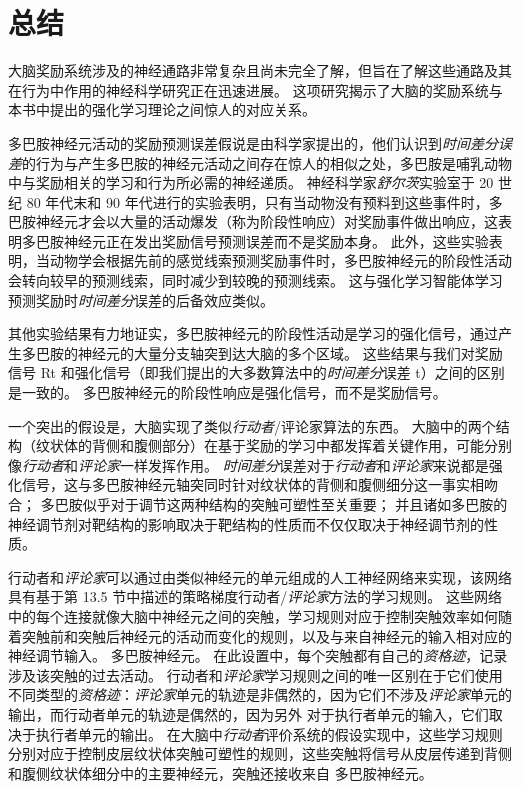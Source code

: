 \section{总结}

大脑奖励系统涉及的神经通路非常复杂且尚未完全了解，但旨在了解这些通路及其在行为中作用的神经科学研究正在迅速进展。
这项研究揭示了大脑的奖励系统与本书中提出的强化学习理论之间惊人的对应关系。


多巴胺神经元活动的奖励预测误差假说是由科学家提出的，他们认识到\textit{时间差分误差}的行为与产生多巴胺的神经元活动之间存在惊人的相似之处，多巴胺是哺乳动物中与奖励相关的学习和行为所必需的神经递质。
神经科学家\textit{舒尔茨}实验室于 20 世纪 80 年代末和 90 年代进行的实验表明，只有当动物没有预料到这些事件时，多巴胺神经元才会以大量的活动爆发（称为阶段性响应）对奖励事件做出响应，这表明多巴胺神经元正在发出奖励信号预测误差而不是奖励本身。
此外，这些实验表明，当动物学会根据先前的感觉线索预测奖励事件时，多巴胺神经元的阶段性活动会转向较早的预测线索，同时减少到较晚的预测线索。
这与强化学习智能体学习预测奖励时\textit{时间差分}误差的后备效应类似。


其他实验结果有力地证实，多巴胺神经元的阶段性活动是学习的强化信号，通过产生多巴胺的神经元的大量分支轴突到达大脑的多个区域。
这些结果与我们对奖励信号 Rt 和强化信号（即我们提出的大多数算法中的\textit{时间差分}误差 t）之间的区别是一致的。
多巴胺神经元的阶段性响应是强化信号，而不是奖励信号。


一个突出的假设是，大脑实现了类似\textit{行动者}/评论家算法的东西。
大脑中的两个结构（纹状体的背侧和腹侧部分）在基于奖励的学习中都发挥着关键作用，可能分别像\textit{行动者}和\textit{评论家}一样发挥作用。
\textit{时间差分}误差对于\textit{行动者}和\textit{评论家}来说都是强化信号，这与多巴胺神经元轴突同时针对纹状体的背侧和腹侧细分这一事实相吻合；
多巴胺似乎对于调节这两种结构的突触可塑性至关重要；
并且诸如多巴胺的神经调节剂对靶结构的影响取决于靶结构的性质而不仅仅取决于神经调节剂的性质。


行动者和\textit{评论家}可以通过由类似神经元的单元组成的人工神经网络来实现，该网络具有基于第 13.5 节中描述的策略梯度行动者/\textit{评论家}方法的学习规则。
这些网络中的每个连接就像大脑中神经元之间的突触，学习规则对应于控制突触效率如何随着突触前和突触后神经元的活动而变化的规则，以及与来自神经元的输入相对应的神经调节输入。
多巴胺神经元。
在此设置中，每个突触都有自己的\textit{资格迹}，记录涉及该突触的过去活动。
行动者和\textit{评论家}学习规则之间的唯一区别在于它们使用不同类型的\textit{资格迹}：\textit{评论家}单元的轨迹是非偶然的，因为它们不涉及\textit{评论家}单元的输出，而行动者单元的轨迹是偶然的，因为另外 对于执行者单元的输入，它们取决于执行者单元的输出。
在大脑中\textit{行动者}评价系统的假设实现中，这些学习规则分别对应于控制皮层纹状体突触可塑性的规则，这些突触将信号从皮层传递到背侧和腹侧纹状体细分中的主要神经元，突触还接收来自 多巴胺神经元。


